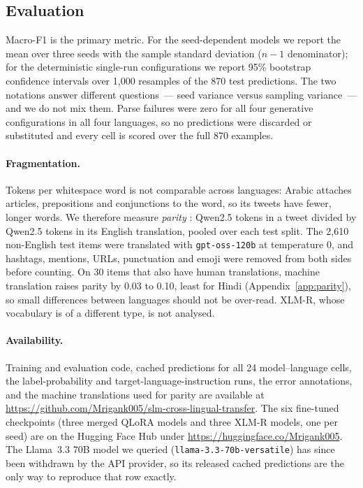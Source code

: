 \documentclass[11pt]{article}
\begin{document}
\subsection{Evaluation}
Macro-F1 is the primary metric. For the seed-dependent models we report the mean
over three seeds with the sample standard deviation ($n{-}1$ denominator); for
the deterministic
single-run configurations we report 95\% bootstrap confidence intervals over
1{,}000 resamples of the 870 test predictions. The two notations answer different
questions~--- seed variance versus sampling variance~--- and we do not mix them.
Parse failures were zero for all four generative configurations in all four
languages, so no predictions were discarded or substituted and every cell is
scored over the full 870 examples.

\paragraph{Fragmentation.} Tokens per whitespace word is not comparable across
languages: Arabic attaches articles, prepositions and conjunctions to the word, so
its tweets have fewer, longer words. We therefore measure \emph{parity}
\citep{petrov2023tokenizers}: Qwen2.5 tokens in a tweet divided by Qwen2.5 tokens
in its English translation, pooled over each test split. The 2{,}610 non-English
test items were translated with \texttt{gpt-oss-120b} \citep{openai2025gptoss} at
temperature 0, and hashtags, mentions, URLs, punctuation and emoji were removed from
both sides before counting. On 30 items that also have human translations, machine
translation raises parity by 0.03 to 0.10, least for Hindi
(Appendix~\ref{app:parity}), so small differences between languages should not be
over-read. \mbox{XLM-R}, whose vocabulary is of a different type, is not analysed.

\paragraph{Availability.} Training and evaluation code, cached predictions for all
24 model--language cells, the label-probability and target-language-instruction
runs, the error annotations, and the machine translations used for parity are
available at
\url{https://github.com/Mrigank005/slm-cross-lingual-transfer}. The six fine-tuned
checkpoints (three merged QLoRA models and three \mbox{XLM-R} models, one per seed) are on
the Hugging Face Hub under \url{https://huggingface.co/Mrigank005}. The Llama~3.3
70B model we queried (\texttt{llama-3.3-70b-versatile}) has since been withdrawn by
the API provider, so its released cached predictions are the only way to reproduce
that row exactly.
\end{document}

